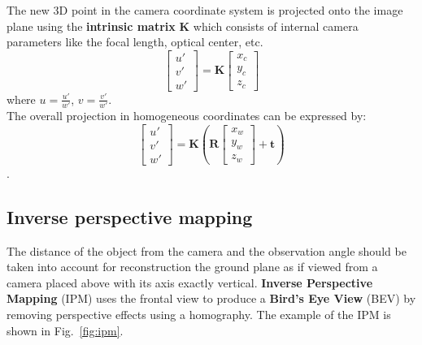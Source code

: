 \documentclass[graybox]{svmult}
\begin{document}
The new 3D point in the camera coordinate system is projected onto the image plane using the \textbf{intrinsic matrix} $\textbf{K}$ which consists of internal camera parameters like the focal length, optical center, etc.
$$
\begin{bmatrix}
		u'\\v'\\w'
		\end{bmatrix}=		
		 \textbf{K}
		\begin{bmatrix}
		x_{c}\\y_{c}\\z_{c}
		\end{bmatrix}
    \label{eq:k1}
$$
where $u = \frac{u'}{w'}$, $v = \frac{v'}{w'}$.\\
The overall projection in homogeneous coordinates can be expressed by:
$$ \begin{bmatrix}
		u'\\v'\\w'
		\end{bmatrix}=
		\textbf{K} \left(\textbf{R}
		\begin{bmatrix}
	    x_w\\y_w\\z_w		
	    \end{bmatrix}
		+ \textbf{t} \right)$$. %



\subsection{Inverse perspective mapping}
The distance of the object from the camera and the observation angle should be taken into account for reconstruction
the ground plane as if viewed from a camera placed above with its axis exactly vertical.
\textbf{Inverse Perspective Mapping} (IPM) uses the frontal view to produce a \textbf{Bird’s Eye View} (BEV) by removing perspective effects using a homography. The example of the IPM is shown in Fig.~\ref{fig:ipm}.
\end{document}
